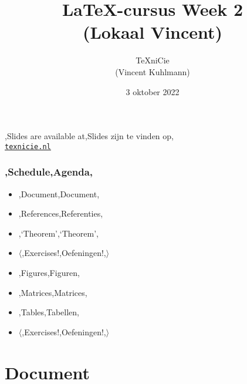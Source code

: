\documentclass[
    dutch,
    everyoneauthor=true,
    defaultSlideCollection=vincent,
]{../../cursuspresentatie}
\title[\LaTeX{}-cursus Week 2]{\LaTeX{}-cursus Week 2\\(Lokaal Vincent)}
\author[\TeX niCie]{\TeX niCie\\{\tiny (Vincent Kuhlmann)}}
\date{3 oktober 2022}
\let\placetarget\relax
\let\placetarget\relax
\begin{document}

\begin{frame}
    \titlepage
    \centering

    {\Large\lang,Slides are available at,Slides zijn te vinden op,\\
    \href{https://texnicie.nl}{\ul{\texttt{texnicie.nl}}}}
\end{frame}

\setul{1pt}{2pt}

\begin{frame}
    \frametitle{\lang,Schedule,Agenda,}
    
    \begin{itemize}
        \item \lang,Document,Document,
        \item \lang,References,Referenties,
        \item \lang,`Theorem',`Theorem',
        \item $ \langle $\lang,Exercises!,Oefeningen!,$ \rangle $
        \item \lang,Figures,Figuren,
        \item \lang,Matrices,Matrices,
        \item \lang,Tables,Tabellen,
        \item $ \langle $\lang,Exercises!,Oefeningen!,$ \rangle $
    \end{itemize}
\end{frame}

\section{Document}\label{sec:document}

\def\placetarget{\hypertarget{document}{}}

\end{document}
